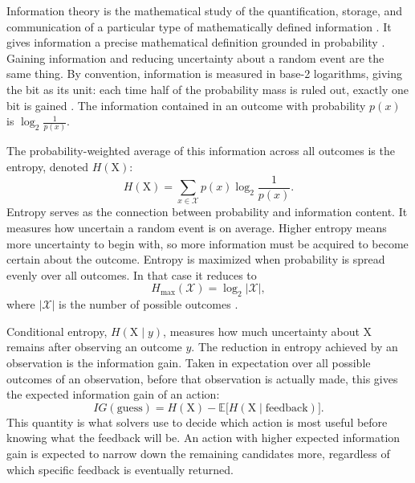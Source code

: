 Information theory is the mathematical study of the quantification, storage, and communication of a particular type of mathematically defined information \cite{InformationTheory2026}. It gives information a precise mathematical definition grounded in probability \cite{shannonMathematicalTheoryCommunication1948}. Gaining information and reducing uncertainty about a random event are the same thing. By convention, information is measured in base-2 logarithms, giving the bit as its unit: each time half of the probability mass is ruled out, exactly one bit is gained \cite{pinkardVisualIntroductionInformation2026}. The information contained in an outcome with probability $p(x)$ is $\log_2 \frac{1}{p(x)}$.

The probability-weighted average of this information across all outcomes is the entropy, denoted $H(\mathrm{X})$:
\begin{equation}
H(\mathrm{X}) = \sum_{x \in \mathcal{X}} p(x) \log_2 \frac{1}{p(x)}.
\label{eq:entropy}
\end{equation}
Entropy serves as the connection between probability and information content. It measures how uncertain a random event is on average. Higher entropy means more uncertainty to begin with, so more information must be acquired to become certain about the outcome. Entropy is maximized when probability is spread evenly over all outcomes. In that case it reduces to
\begin{equation}
H_{\text{max}}(\mathcal{X}) = \log_2 |\mathcal{X}|,
\label{eq:maxentropy}
\end{equation}
where $|\mathcal{X}|$ is the number of possible outcomes \cite{pinkardVisualIntroductionInformation2026}.

Conditional entropy, $H(\mathrm{X} \mid y)$, measures how much uncertainty about $\mathrm{X}$ remains after observing an outcome $y$. The reduction in entropy achieved by an observation is the information gain. Taken in expectation over all possible outcomes of an observation, before that observation is actually made, this gives the expected information gain of an action:
\begin{equation}
IG(\text{guess}) = H(\mathrm{X}) - \mathbb{E}\big[H(\mathrm{X} \mid \text{feedback})\big].
\label{eq:infogain}
\end{equation}
This quantity is what solvers use to decide which action is most useful before knowing what the feedback will be. An action with higher expected information gain is expected to narrow down the remaining candidates more, regardless of which specific feedback is eventually returned.

